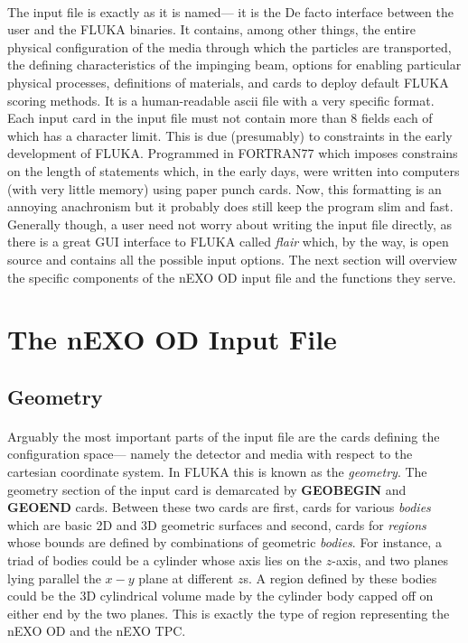 \documentclass[10pt]{article}
\begin{document}
    \paragraph{}
    The input file is exactly as it is named— it is the De facto interface between the user and the FLUKA binaries. It contains, among other things, the entire physical configuration of the media through which the particles are transported, the defining characteristics of the impinging beam, options for enabling particular physical processes, definitions of materials, and cards to deploy default FLUKA scoring methods. It is a human-readable ascii file with a very specific format. Each input card in the input file must not contain more than 8 fields each of which has a character limit. This is due (presumably) to constraints in the early development of FLUKA. Programmed in FORTRAN77 which imposes constrains on the length of statements which, in the early days, were written into computers (with very little memory) using paper punch cards. Now, this formatting is an annoying anachronism but it probably does still keep the program slim and fast. Generally though, a user need not worry about writing the input file directly, as there is a great GUI interface to FLUKA called \textit{flair} which, by the way, is open source and contains all the possible input options. The next section will overview the specific components of the nEXO OD input file and the functions they serve.


\section{The nEXO OD Input File}

\subsection{Geometry}
\paragraph{}
Arguably the most important parts of the input file are the cards defining the configuration space— namely the detector and media with respect to the cartesian coordinate system. In FLUKA this is known as the \textit{geometry}. The geometry section of the input card is demarcated by \textbf{GEOBEGIN} and \textbf{GEOEND} cards. Between these two cards are first, cards for various \textit{bodies} which are basic 2D and 3D geometric surfaces and second, cards for \textit{regions} whose bounds are defined by combinations of geometric \textit{bodies}. For instance, a triad of bodies could be a cylinder whose axis lies on the $z$-axis, and two planes lying parallel the $x-y$ plane at different $z$s. A region defined by these bodies could be the 3D cylindrical volume made by the cylinder body capped off on either end by the two planes. This is exactly the type of region representing the nEXO OD and the nEXO TPC. 
\end{document}
